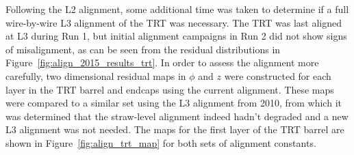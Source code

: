 Following the L2 alignment, some additional time was taken to determine if a full wire-by-wire L3 alignment of the TRT was necessary.
The TRT was last aligned at L3 during Run 1, but initial alignment campaigns in Run 2 did not show signs of misalignment, as can be seen from the residual distributions in Figure~\ref{fig:align_2015_results_trt}.
In order to assess the alignment more carefully, two dimensional residual maps in $\phi$ and $z$ were constructed for each layer in the TRT barrel and endcaps using the current alignment.
These maps were compared to a similar set using the L3 alignment from 2010, from which it was determined that the straw-level alignment indeed hadn't degraded and a new L3 alignment was not needed.
The maps for the first layer of the TRT barrel are shown in Figure~\ref{fig:align_trt_map} for both sets of alignment constants.


